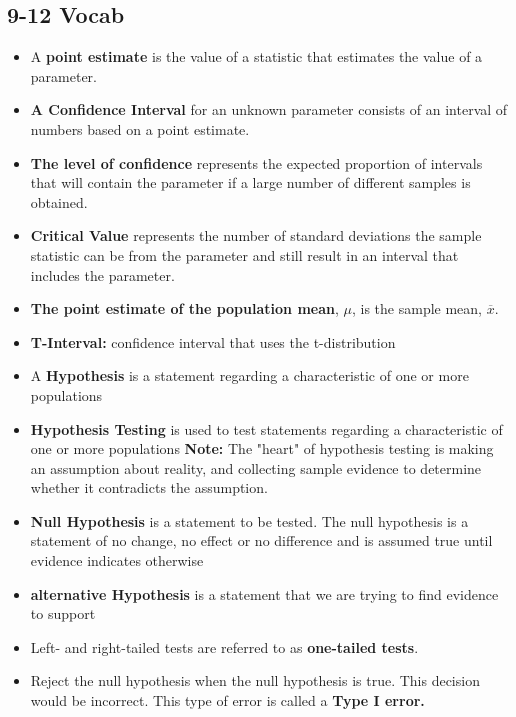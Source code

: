 \documentclass{report}
\begin{document}
        \pagebreak 
        \subsection*{9-12 Vocab}
        \begin{itemize}
          \item A \textbf{point estimate} is the value of a statistic that estimates the value of a parameter.
          \item \textbf{A Confidence Interval} for an  unknown parameter consists of an interval of numbers based on a point estimate.
          \item \textbf{The level of confidence} represents the expected proportion of intervals that will contain the parameter if a large number of different samples is obtained.
          \item \textbf{Critical Value} represents the number of standard deviations the sample statistic can be from the parameter and still result in an interval that includes the parameter.
          \item \textbf{The point estimate of the population mean}, $\mu$, is the sample mean, $\overline{x}$.
          \item \textbf{T-Interval:} confidence interval that uses the t-distribution
          \item A \textbf{Hypothesis} is a statement regarding a characteristic of one or more populations
          \item \textbf{Hypothesis Testing} is used to test statements regarding a characteristic of one or more populations
          \textbf{Note:} The "heart" of hypothesis testing is making an assumption about reality, and collecting sample evidence to determine whether it contradicts the assumption.
          \item \textbf{Null Hypothesis} is a statement to be tested. The null hypothesis is a statement of no change, no effect or no difference and is assumed true until evidence indicates otherwise
          \item \textbf{alternative Hypothesis} is a statement that we are trying to find evidence to support
          \item Left- and right-tailed tests are referred to as \textbf{one-tailed tests}. 
          \item Reject the null hypothesis when the null hypothesis is true. This decision would be incorrect. This type of error is called a \textbf{Type I error.}

\end{itemize}
\end{document}
